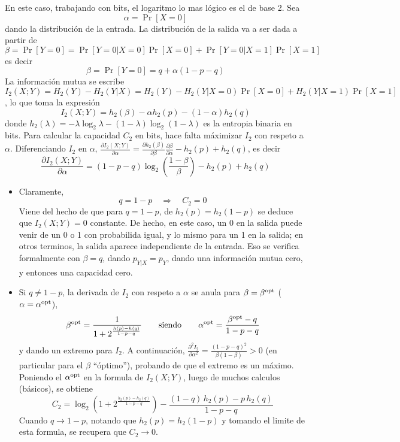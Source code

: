 En este caso, trabajando con bits, el logaritmo lo mas l\'ogico es el de base 2.
Sea
%
\[
\alpha = \Pr[X = 0]
\]
%
dando la distribuci\'on  de la entrada. La distribuci\'on de la  salida va a ser
dada a partir de $\beta = \Pr[Y = 0] = \Pr[Y = 0 | X = 0] \Pr[X = 0] + \Pr[Y = 0
| X =  1] \Pr[X = 1]$  es decir
%
\[
\beta = \Pr[Y  = 0] = q +  \alpha (1-p-q)
\]
%
La  informaci\'on mutua  se escribe  $I_2(X;Y) =  H_2(Y) -  H_2(Y|X) =  H_2(Y) -
H_2(Y|X=0) \Pr[X = 0] + H_2(Y|X=1) \Pr[X = 1]$, lo que toma la expresi\'on
%
\[
I_2(X;Y) = h_2(\beta) - \alpha h_2(p) - (1-\alpha) h_2(q)
\]
%
donde $h_2(\lambda) = - \lambda \log_2 \lambda - (1-\lambda) \log_2 (1-\lambda)$
es la entropia binaria en bits.   Para calcular la capacidad $C_2$ en bits, hace
falta  m\'aximizar  $I_2$  con  respeto  a  $\alpha$.   Diferenciando  $I_2$  en
$\alpha$,  \ie  $\frac{\partial   I_2(X;Y)}{\partial  \alpha}  =  \frac{\partial
  h_2(\beta)}{\partial \beta} \frac{\partial  \beta}{\partial \alpha} - h_2(p) +
h_2(q)$, es decir
%
\[
\frac{\partial    I_2(X;Y)}{\partial   \alpha}    =   (1-p-q)    \log_2   \left(
  \frac{1-\beta}{\beta} \right) - h_2(p) + h_2(q)
\]
%
\begin{itemize}
\item Claramente,
  \[
  q = 1-p \quad \Rightarrow \quad C_2 = 0
  \]
  Viene del hecho  de que para $q =  1-p$, de $h_2(p) = h_2(1-p)$  se deduce que
  $I_2(X;Y) =  0$ constante. De  hecho, en  este caso, un  0 en la  salida puede
  venir de un 0 o 1 con probabilida igual, y lo mismo para un 1 en la salida; en
  otros  terminos,  la salida  aparece  independiente  de  la entrada.   Eso  se
  verifica  formalmente  con $\beta  =  q$, dando  $p_{Y|X}  =  p_Y$, dando  una
  informaci\'on mutua cero, y entonces una capacidad cero.
%
\item Si $q \ne 1-p$, la derivada  de $I_2$ con respeto a $\alpha$ se anula para
  $\beta = \beta^{\mathrm{opt}}$ ($\alpha = \alpha^{\mathrm{opt}}$),
  \[
  \beta^{\mathrm{opt}}  =   \frac{1}{1+2^{\frac{h(p)-h(q)}{1-p-q}}}  \qquad  \mbox{siendo}
  \qquad \alpha^{\mathrm{opt}} = \frac{\beta^{\mathrm{opt}} - q}{1-p-q}
  \]
  y  dando   un  extremo   para  $I_2$.   A   continuaci\'on,  $\frac{\partial^2
    I_2}{\partial  \alpha^2}  =   \frac{(1-p-q)^2}{\beta  (1-\beta)}  >  0$  (en
  particular para  el $\beta$  ``\'optimo''), probando de  que el extremo  es un
  m\'aximo.  Poniendo  el $\alpha^{\mathrm{opt}}$  en la formula  de $I_2(X;Y)$,  luego de
  muchos calculos (b\'asicos), se obtiene
  \[
  C_2 =  \log_2\left( 1 + 2^{\frac{h_2(p)-h_2(q)}{1-p-q}}  \right) - \frac{(1-q)
    \, h_2(p) - p \, h_2(q)}{1-p-q}
  \]
  Cuando $q  \to 1-p$, notando  que $h_2(p) =  h_2(1-p)$ y tomando el  limite de
  esta formula, se recupera que $C_2 \to 0$.
\end{itemize}
